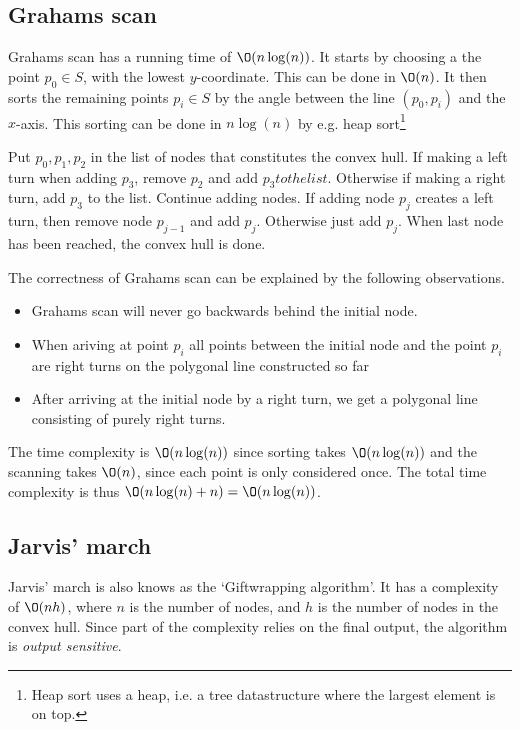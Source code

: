 \documentclass[10pt]{article}
\begin{document}
\subsection{Grahams scan} %
\label{sub:grahams_scan}
Grahams scan has a running time of $\O(n\log(n))$. It starts by choosing a the point $p_0 \in S$, with the lowest $y$-coordinate. This can be done in $\O(n)$. It then sorts the remaining points $p_i \in S$ by the angle between the line $(p_0, p_i)$ and the $x$-axis. This sorting can be done in $n \log(n)$ by e.g. heap sort\footnote{Heap sort uses a heap, i.e. a tree datastructure where the largest element is on top.} 

Put $p_0, p_1, p_2$ in the list of nodes that constitutes the convex hull. If making a left turn when adding $p_3$, remove $p_2$ and add $p_3 to the list$. Otherwise if making a right turn, add $p_3$ to the list. Continue adding nodes. If adding node $p_j$ creates a left turn, then remove node $p_{j-1}$ and add $p_j$. Otherwise just add $p_j$. When last node has been reached, the convex hull is done.

The correctness of Grahams scan can be explained by the following observations. 

\begin{itemize}
  \item Grahams scan will never go backwards behind the initial node. 
  \item When ariving at point $p_i$ all points between the initial node and the point $p_i$ are right turns on the polygonal line constructed so far
  \item After arriving at the initial node by a right turn, we get a polygonal line consisting of purely right turns. 
\end{itemize}



The time complexity is $\O(n\log(n))$ since sorting takes $\O(n\log(n))$ and the scanning takes $\O(n)$, since each point is only considered once. The total time complexity is thus $\O(n\log(n)+n)=\O(n\log(n))$.


\subsection{Jarvis' march} %
\label{sub:jarvis_march}
Jarvis' march is also knows as the `Giftwrapping algorithm'. It has a complexity of $\O(nh)$, where $n$ is the number of nodes, and $h$ is the number of nodes in the convex hull. Since part of the complexity relies on the final output, the algorithm is \emph{output sensitive}.
\end{document}
